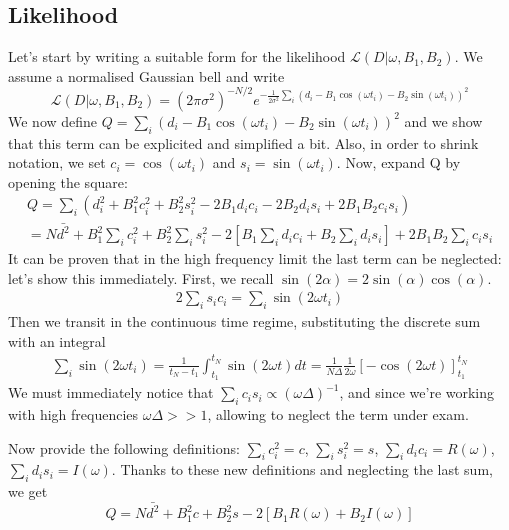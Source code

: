 \documentclass[a4paper,11pt,fleqn]{article}
\begin{document}
\subsection{Likelihood}
Let's start by writing a suitable form for the likelihood 
$\mathcal{L}(D|\omega, B_1, B_2)$. We assume a normalised Gaussian bell 
and write 
\begin{equation}
    \mathcal{L}(D|\omega, B_1, B_2) = (2\pi\sigma^2)^{-N/2}e^{-\frac{1}{2\sigma^2}\sum_i(d_i-B_1 \cos(\omega t_i)-B_2 \sin(\omega t_i))^2}
\end{equation}
We now define $Q = \sum_i(d_i-B_1 \cos(\omega t_i)-B_2 \sin(\omega t_i))^2$ and we show 
that this term can be explicited and simplified a bit. Also, in order to 
shrink notation, we set $c_i = \cos(\omega t_i)$ and $s_i = \sin(\omega t_i)$.
Now, expand Q by opening the square:
\begin{gather*}
    Q = \sum_i (d_i^2 + B_1^2 c_i^2 + B_2^2 s_i^2 -2B_1d_ic_i -2B_2d_is_i +2B_1B_2c_is_i) \\
    = N\bar{d^2}+B_1^2\sum_ic_i^2+B_2^2\sum_is_i^2 -2[B_1\sum_id_ic_i +B_2\sum_id_is_i]+2B_1B_2\sum_ic_is_i
\end{gather*}
It can be proven that in the high frequency limit the last term 
can be neglected: let's show this immediately. First, we recall 
$\sin(2\alpha) = 2\sin(\alpha)\cos(\alpha)$.
\begin{gather*}
    2\sum_is_ic_i = \sum_i\sin(2\omega t_i)
\end{gather*}
Then we transit in the continuous time regime, substituting the discrete sum 
with an integral
\begin{gather*}
    \sum_i\sin(2\omega t_i) = \frac{1}{t_N-t_1}\int_{t_1}^{t_N}\sin(2\omega t) dt = \frac{1}{N\Delta} \frac{1}{2\omega}\left[-\cos(2\omega t)\right]_{t_1}^{t_N}
\end{gather*} 
We must immediately notice that $\sum_ic_is_i\propto (\omega\Delta)^{-1}$, 
and since we're working with high frequencies $\omega\Delta >> 1$, allowing 
to neglect the term under exam.

Now provide the following definitions: $\sum_ic_i^2 = c$, $\sum_is_i^2 = s$, 
$\sum_i d_i c_i = R(\omega)$, $\sum_i d_i s_i = I(\omega)$. 
Thanks to these new definitions and neglecting the last sum, we get 
\begin{equation}
    Q = N\bar{d^2}+B_1^2c+B_2^2s -2[B_1R(\omega) +B_2I(\omega)]
\end{equation}
\end{document}
